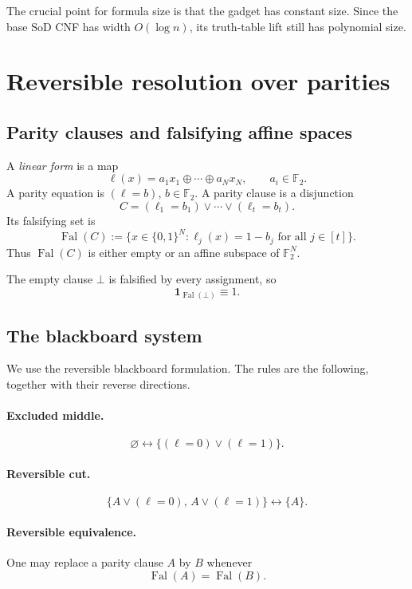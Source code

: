\documentclass[11pt]{article}
\theoremstyle{definition}
\newcommand{\F}{\mathbb F}
\newcommand{\bits}{\{0,1\}}
\newcommand{\Fal}{\operatorname{Fal}}
\newcommand{\SoD}{\mathrm{SoD}}
\begin{document}
The crucial point for formula size is that the gadget has constant size.  Since the
base $\SoD$ CNF has width $O(\log n)$, its truth-table lift still has polynomial size.

\section{Reversible resolution over parities}\label{sec:revres}

\subsection{Parity clauses and falsifying affine spaces}

A \emph{linear form} is a map
\[
  \ell(x)=a_1x_1\oplus\cdots\oplus a_Nx_N,
  \qquad a_i\in\F_2.
\]
A parity equation is $(\ell=b)$, $b\in\F_2$.
A parity clause is a disjunction
\[
  C=(\ell_1=b_1)\vee\cdots\vee(\ell_t=b_t).
\]
Its falsifying set is
\[
  \Fal(C)
  :=
  \{x\in\bits^N:\ell_j(x)=1-b_j \text{ for all }j\in[t]\}.
\]
Thus $\Fal(C)$ is either empty or an affine subspace of $\F_2^N$.

The empty clause $\bot$ is falsified by every assignment, so
\[
  \mathbf 1_{\Fal(\bot)}\equiv 1.
\]

\subsection{The blackboard system}

We use the reversible blackboard formulation.  The rules are the following, together
with their reverse directions.

\paragraph{Excluded middle.}
\[
  \varnothing
  \longleftrightarrow
  \{(\ell=0)\vee(\ell=1)\}.
\]

\paragraph{Reversible cut.}
\[
 \{A\vee(\ell=0),\,A\vee(\ell=1)\}
 \longleftrightarrow
 \{A\}.
\]

\paragraph{Reversible equivalence.}
One may replace a parity clause $A$ by $B$ whenever
\[
  \Fal(A)=\Fal(B).
\]
\end{document}
